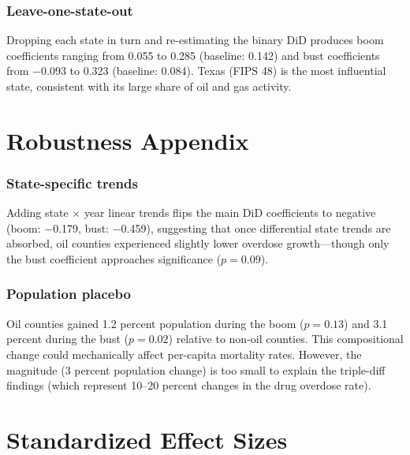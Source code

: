 \documentclass[12pt]{article}
\begin{document}
\subsubsection*{Leave-one-state-out} Dropping each state in turn and re-estimating the binary DiD produces boom coefficients ranging from 0.055 to 0.285 (baseline: 0.142) and bust coefficients from $-$0.093 to 0.323 (baseline: 0.084). Texas (FIPS 48) is the most influential state, consistent with its large share of oil and gas activity.

\section{Robustness Appendix}

\subsubsection*{State-specific trends} Adding state $\times$ year linear trends flips the main DiD coefficients to negative (boom: $-$0.179, bust: $-$0.459), suggesting that once differential state trends are absorbed, oil counties experienced slightly lower overdose growth---though only the bust coefficient approaches significance ($p = 0.09$).

\subsubsection*{Population placebo} Oil counties gained 1.2 percent population during the boom ($p = 0.13$) and 3.1 percent during the bust ($p = 0.02$) relative to non-oil counties. This compositional change could mechanically affect per-capita mortality rates. However, the magnitude (3 percent population change) is too small to explain the triple-diff findings (which represent 10--20 percent changes in the drug overdose rate).

\section{Standardized Effect Sizes}
\label{sec:sde}


\end{document}
